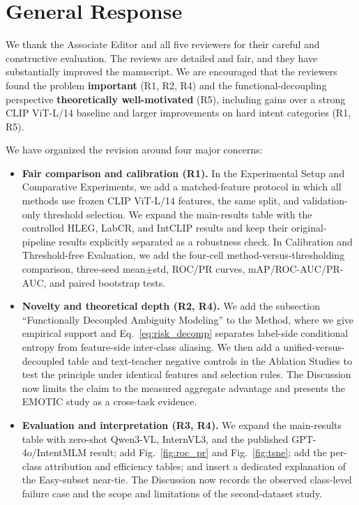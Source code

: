 \section{General Response}

We thank the Associate Editor and all five reviewers for their careful and constructive evaluation. The reviews are detailed and fair, and they have substantially improved the manuscript. We are encouraged that the reviewers found the problem \textbf{important} (R1, R2, R4) and the functional-decoupling perspective \textbf{theoretically well-motivated} (R5), including gains over a strong CLIP ViT-L/14 baseline and larger improvements on hard intent categories (R1, R5).

We have organized the revision around four major concerns:

\begin{itemize}
\item \textbf{Fair comparison and calibration (R1).} In the Experimental Setup and Comparative Experiments, we add a matched-feature protocol in which all methods use frozen CLIP ViT-L/14 features, the same split, and validation-only threshold selection. We expand the main-results table with the controlled HLEG, LabCR, and IntCLIP results and keep their original-pipeline results explicitly separated as a robustness check. In Calibration and Threshold-free Evaluation, we add the four-cell method-versus-thresholding comparison, three-seed mean$\pm$std, ROC/PR curves, mAP/ROC-AUC/PR-AUC, and paired bootstrap tests.

\item \textbf{Novelty and theoretical depth (R2, R4).} We add the subsection ``Functionally Decoupled Ambiguity Modeling'' to the Method, where we give empirical support and Eq.~\eqref{eq:risk_decomp} separates label-side conditional entropy from feature-side inter-class aliasing. We then add a unified-versus-decoupled table and text-teacher negative controls in the Ablation Studies to test the principle under identical features and selection rules. The Discussion now limits the claim to the measured aggregate advantage and presents the EMOTIC study as a cross-task evidence.

\item \textbf{Evaluation and interpretation (R3, R4).} We expand the main-results table with zero-shot Qwen3-VL, InternVL3, and the published GPT-4o/IntentMLM result; add Fig.~\ref{fig:roc_pr} and Fig.~\ref{fig:tsne}; add the per-class attribution and efficiency tables; and insert a dedicated explanation of the Easy-subset near-tie. The Discussion now records the observed class-level failure case and the scope and limitations of the second-dataset study.


\end{itemize}
